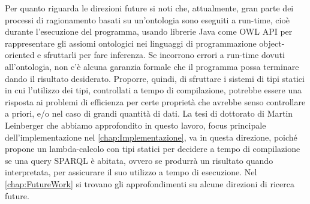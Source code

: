 Per quanto riguarda le direzioni future si noti che, attualmente, gran parte dei processi di ragionamento basati su un'ontologia sono eseguiti a run-time, cioè durante l'esecuzione del programma, usando librerie Java come OWL API \cite{OWLAPI} per rappresentare gli assiomi ontologici nei linguaggi di programmazione object-oriented e sfruttarli per fare inferenza. Se incorrono errori a run-time dovuti all'ontologia, non c'è alcuna garanzia formale che il programma possa terminare dando il risultato desiderato. Proporre, quindi, di sfruttare i sistemi di tipi statici in cui l'utilizzo dei tipi, controllati a tempo di compilazione, potrebbe essere una risposta ai problemi di efficienza per certe proprietà che avrebbe senso controllare a priori, e/o nel caso di grandi quantità di dati. La tesi di dottorato di Martin Leinberger \cite{leinbergerphdthesis} che abbiamo approfondito in questo lavoro, focus principale dell'implementazione nel \autoref{chap:Implementazione}, va in questa direzione, poiché propone un lambda-calcolo con tipi statici per decidere a tempo di compilazione se una query SPARQL è abitata, ovvero se produrrà un risultato quando interpretata, per assicurare il suo utilizzo a tempo di esecuzione. Nel \autoref{chap:FutureWork} si trovano gli approfondimenti su alcune direzioni di ricerca future.

